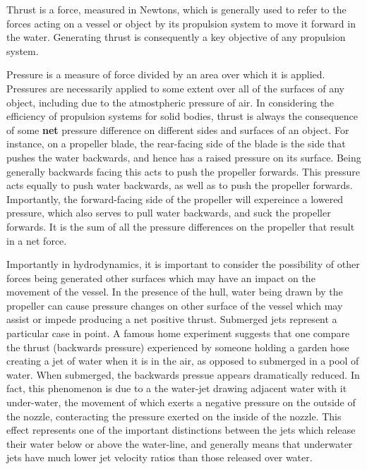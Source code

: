 \documentclass{article}\usepackage[]{graphicx}\usepackage[]{color}
\begin{document}
Thrust is a force, measured in Newtons, which is generally used to refer to the forces acting on a vessel or object by its propulsion system to move it forward in the water.  Generating thrust is consequently a key objective of any propulsion system.

Pressure is a measure of force divided by an area over which it is applied. Pressures are necessarily applied to some extent over all of the surfaces of any object, including due to the atmostpheric pressure of air.  In considering the efficiency of propulsion systems for solid bodies, thrust is always the consequence of some \textbf{net} pressure difference on different sides and surfaces of an object.  For instance, on a propeller blade, the rear-facing side of the blade is the side that pushes the water backwards, and hence has a raised pressure on its surface.  Being generally backwards facing this acts to push the propeller forwards.  This pressure acts equally to push water backwards, as well as to push the propeller forwards.  Importantly, the forward-facing side of the propeller will expereince a lowered pressure, which also serves to pull water backwards, and suck the propeller forwards.  It is the sum of all the pressure differences on the propeller that result in a net force.

Importantly in hydrodynamics, it is important to consider the possibility of other forces being generated other surfaces which may have an impact on the movement of the vessel.  In the presence of the hull, water being drawn by the propeller can cause pressure changes on other surface of the vessel which may assist or impede producing a net positive thrust.  Submerged jets represent a particular case in point.  A famous home experiment suggests that one compare the thrust (backwards pressure) experienced by someone holding a garden hose creating a jet of water when it is in the air, as opposed to submerged in a pool of water.  When submerged, the backwards pressue appears dramatically reduced.  In fact, this phenomenon is due to a the water-jet drawing adjacent water with it under-water, the movement of which exerts a negative pressure on the outside of the nozzle, conteracting the pressure exerted on the inside of the nozzle. This effect represents one of the important distinctions between the jets which release their water below or above the water-line, and generally means that underwater jets have much lower jet velocity ratios than those released over water.
\end{document}
